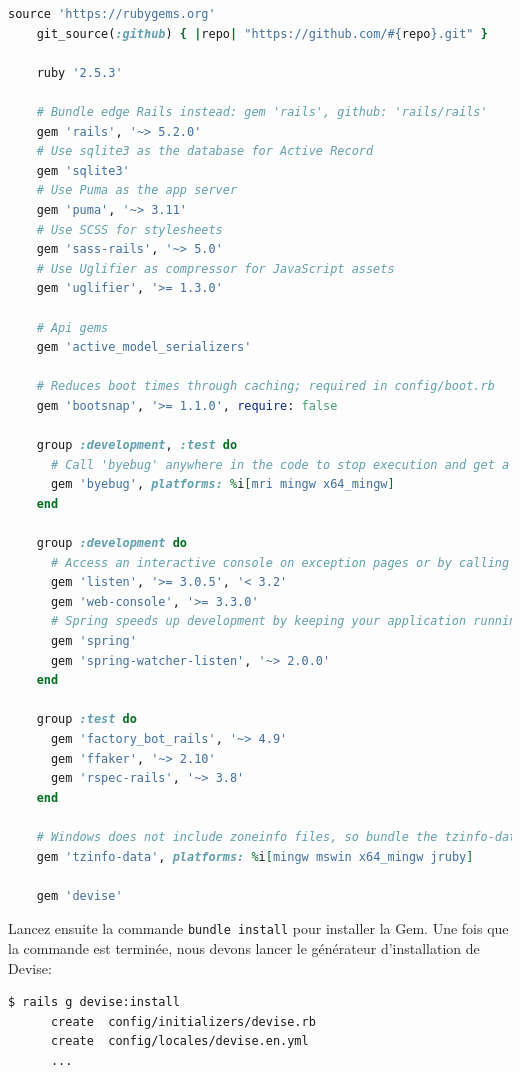 \documentclass[]{report}
\begin{document}
    \begin{scriptsize}
    \begin{lstlisting}[language=ruby, caption={Le Gemfile avec l'ajout de Devise}, label={lst:add_devise_to_gemfile}]
    source 'https://rubygems.org'
    git_source(:github) { |repo| "https://github.com/#{repo}.git" }

    ruby '2.5.3'

    # Bundle edge Rails instead: gem 'rails', github: 'rails/rails'
    gem 'rails', '~> 5.2.0'
    # Use sqlite3 as the database for Active Record
    gem 'sqlite3'
    # Use Puma as the app server
    gem 'puma', '~> 3.11'
    # Use SCSS for stylesheets
    gem 'sass-rails', '~> 5.0'
    # Use Uglifier as compressor for JavaScript assets
    gem 'uglifier', '>= 1.3.0'

    # Api gems
    gem 'active_model_serializers'

    # Reduces boot times through caching; required in config/boot.rb
    gem 'bootsnap', '>= 1.1.0', require: false

    group :development, :test do
      # Call 'byebug' anywhere in the code to stop execution and get a debugger console
      gem 'byebug', platforms: %i[mri mingw x64_mingw]
    end

    group :development do
      # Access an interactive console on exception pages or by calling 'console' anywhere in the code.
      gem 'listen', '>= 3.0.5', '< 3.2'
      gem 'web-console', '>= 3.3.0'
      # Spring speeds up development by keeping your application running in the background. Read more: https://github.com/rails/spring
      gem 'spring'
      gem 'spring-watcher-listen', '~> 2.0.0'
    end

    group :test do
      gem 'factory_bot_rails', '~> 4.9'
      gem 'ffaker', '~> 2.10'
      gem 'rspec-rails', '~> 3.8'
    end

    # Windows does not include zoneinfo files, so bundle the tzinfo-data gem
    gem 'tzinfo-data', platforms: %i[mingw mswin x64_mingw jruby]

    gem 'devise'
    \end{lstlisting}
    \end{scriptsize}

    Lancez ensuite la commande \verb|bundle install| pour installer la Gem. Une fois que la commande est terminée, nous devons lancer le générateur d'installation de Devise:

    \begin{scriptsize}
    \begin{lstlisting}[language=bash]
    $ rails g devise:install
      create  config/initializers/devise.rb
      create  config/locales/devise.en.yml
      ...
    \end{lstlisting}
    \end{scriptsize}
\end{document}
